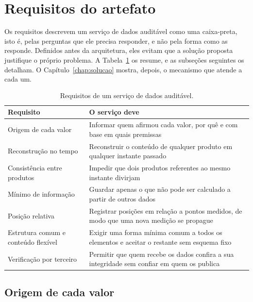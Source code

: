\section{Requisitos do artefato}\label{sec:requisitos}

Os requisitos descrevem um serviço de dados auditável como uma caixa-preta, isto é, pelas perguntas que ele precisa responder, e não pela forma como as responde. Definidos antes da arquitetura, eles evitam que a solução proposta justifique o próprio problema. A Tabela~\ref{tab:requisitos} os resume, e as subseções seguintes os detalham. O Capítulo~\ref{chap:solucao} mostra, depois, o mecanismo que atende a cada um.

\begin{table}[htbp]
    \centering
    \caption{Requisitos de um serviço de dados auditável.}
    \label{tab:requisitos}
    \begin{tabularx}{\linewidth}{l X}
        \toprule
        Requisito & O serviço deve \\
        \midrule
        Origem de cada valor & Informar quem afirmou cada valor, por quê e com base em quais premissas \\
        Reconstrução no tempo & Reconstruir o conteúdo de qualquer produto em qualquer instante passado \\
        Consistência entre produtos & Impedir que dois produtos referentes ao mesmo instante divirjam \\
        Mínimo de informação & Guardar apenas o que não pode ser calculado a partir de outros dados \\
        Posição relativa & Registrar posições em relação a pontos medidos, de modo que uma nova medição se propague \\
        Estrutura comum e conteúdo flexível & Exigir uma forma mínima comum a todos os elementos e aceitar o restante sem esquema fixo \\
        Verificação por terceiro & Permitir que quem recebe os dados confira a sua integridade sem confiar em quem os publica \\
        \bottomrule
    \end{tabularx}
    \par{}
\end{table}

\subsection{Origem de cada valor}\label{sec:req-origem}

